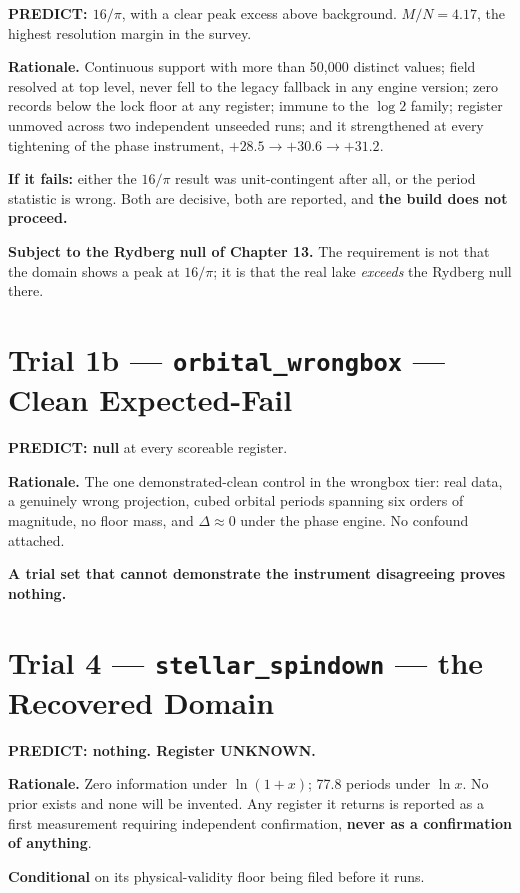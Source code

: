 \documentclass[11pt, letterpaper, openany]{book}
\begin{document}
\begin{predictionbox}
\textbf{PREDICT: $16/\pi$}, with a clear peak excess above background. $M/N = 4.17$, the highest
resolution margin in the survey.

\medskip
\textbf{Rationale.} Continuous support with more than 50{,}000 distinct values; field resolved at
top level, never fell to the legacy fallback in any engine version; zero records below the lock
floor at any register; immune to the $\log 2$ family; register unmoved across two independent
unseeded runs; and it strengthened at every tightening of the phase instrument,
$+28.5 \to +30.6 \to +31.2$.

\medskip
\textbf{If it fails:} either the $16/\pi$ result was unit-contingent after all, or the period
statistic is wrong. Both are decisive, both are reported, and \textbf{the build does not
proceed.}
\end{predictionbox}

\textbf{Subject to the Rydberg null of Chapter 13.} The requirement is not that the domain shows
a peak at $16/\pi$; it is that the real lake \emph{exceeds} the Rydberg null there.

\section{Trial 1b --- \texttt{orbital\_wrongbox} --- Clean Expected-Fail}

\begin{predictionbox}
\textbf{PREDICT: null} at every scoreable register.

\medskip
\textbf{Rationale.} The one demonstrated-clean control in the wrongbox tier: real data, a
genuinely wrong projection, cubed orbital periods spanning six orders of magnitude, no floor
mass, and $\Delta \approx 0$ under the phase engine. No confound attached.

\medskip
\textbf{A trial set that cannot demonstrate the instrument disagreeing proves nothing.}
\end{predictionbox}

\section{Trial 4 --- \texttt{stellar\_spindown} --- the Recovered Domain}

\begin{predictionbox}
\textbf{PREDICT: nothing. Register UNKNOWN.}

\medskip
\textbf{Rationale.} Zero information under $\ln(1+x)$; 77.8 periods under $\ln x$. No prior
exists and none will be invented. Any register it returns is reported as a first measurement
requiring independent confirmation, \textbf{never as a confirmation of anything}.

\medskip
\textbf{Conditional} on its physical-validity floor being filed before it runs.
\end{predictionbox}
\end{document}
